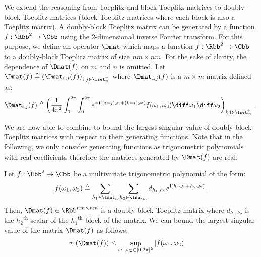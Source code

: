 We extend the reasoning from Toeplitz and block Toeplitz matrices to doubly-block Toeplitz matrices (\ie block Toeplitz matrices where each block is also a Toeplitz matrix).
A doubly-block Toeplitz matrix can be generated by a function $f: \Rbb^2 \rightarrow \Cbb$ using the 2-dimensional inverse Fourier transform.
For this purpose, we define an operator $\Dmat$ which maps a function $f: \Rbb^2 \rightarrow \Cbb$ to a doubly-block Toeplitz matrix of size $nm \times nm$.
For the sake of clarity, the dependence of $\Dmat(f)$ on $m$ and $n$ is omitted.
Let $\Dmat(f) \triangleq \leftmat \Dmat_{i,j}(f)\rightmat_{i,j \in \Iset^+_n}$ where $\Dmat_{i,j}(f)$ is a $m \times m$ matrix defined as:
\begin{equation} \label{equation:doubly_block_toeplitz_operator}
  \Dmat_{i,j}(f) \triangleq \leftmat \frac{1}{4\pi^{2}} \int_{0}^{2\pi} \int_{0}^{2\pi} e^{- \ci \left((i-j)\omega_{1}+(k-l)\omega_{2}\right)}f(\omega_{1},\omega_{2}) \diff \omega_{1} \diff \omega_{2} \rightmat_{k,l \in \Iset^+_m} \enspace.
\end{equation}

We are now able to combine  to bound the largest singular value of doubly-block Toeplitz matrices with respect to their generating functions. 
Note that in the following, we only consider generating functions as trigonometric polynomials with real coefficients therefore the matrices generated by $\Dmat(f)$ are real.

\begin{maintheorem} \label{theorem:doubly_block_teoplitz_sup_singular}
  Let $f: \Rbb^2 \rightarrow \Cbb$ be a multivariate trigonometric polynomial of the form:
  \begin{equation}\label{equation:muli_variate_poly_on_M}
    f(\omega_1, \omega_2) \triangleq \sum_{h_1 \in \Iset_n} \sum_{h_2 \in \Iset_m} d_{h_1, h_2} e^{\ci (h_1 \omega_1 + h_2 \omega_2)}.
  \end{equation}
  Then, $\Dmat(f) \in \Rbb^{nm \times nm}$ is a doubly-block Toeplitz matrix where $d_{h_{1},h_{2}}$ is the ${h_2}^\textrm{th}$ scalar of the ${h_1}^\textrm{th}$ block of the matrix.
  We can bound the largest singular value of the matrix $\Dmat(f)$ as follows:
  \begin{align}
    \sigma_{1} \left( \Dmat(f) \right) &\leq \sup_{\omega_1, \omega_2 \in [0, 2\pi]^2}|f(\omega_1,\omega_2)|
  \end{align}
  \removespace
\end{maintheorem}


